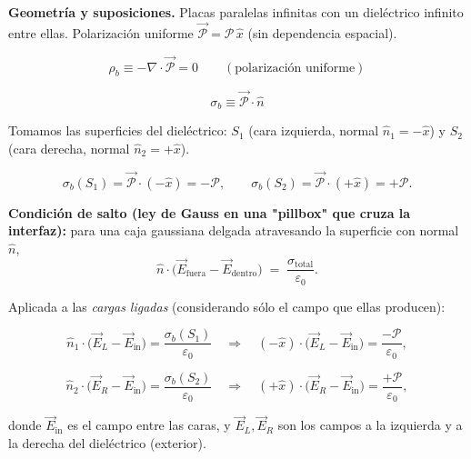 \documentclass{article}
\begin{document}
\textbf{Geometría y suposiciones.} Placas paralelas infinitas con un dieléctrico infinito entre ellas.
Polarización uniforme \(\vec{\mathcal P}= \mathcal P\,\hat{x}\) (sin dependencia espacial).

\begin{equation}
\rho_b \equiv -\nabla\cdot\vec{\mathcal P}=0 \qquad (\text{polarización uniforme})
\end{equation}

\begin{equation}
\sigma_b \equiv \vec{\mathcal P}\cdot\hat{n}
\end{equation}

Tomamos las superficies del dieléctrico:
\(S_1\) (cara izquierda, normal \(\hat{n}_1=-\hat{x}\)) y
\(S_2\) (cara derecha, normal \(\hat{n}_2=+\hat{x}\)).

\begin{equation}
\sigma_b(S_1)=\vec{\mathcal P}\cdot(-\hat{x})=-\mathcal P,
\qquad
\sigma_b(S_2)=\vec{\mathcal P}\cdot(+\hat{x})=+\mathcal P.
\end{equation}

\textbf{Condición de salto (ley de Gauss en una "pillbox" que cruza la interfaz):}
para una caja gaussiana delgada atravesando la superficie con normal \(\hat{n}\),
\begin{equation}
\hat{n}\cdot\big(\vec{E}_{\text{fuera}}-\vec{E}_{\text{dentro}}\big) \;=\; \frac{\sigma_{\text{total}}}{\varepsilon_0}.
\end{equation}

Aplicada a las \emph{cargas ligadas} (considerando sólo el campo que ellas producen):

\begin{equation}
\hat{n}_1\cdot\big(\vec{E}_{L}-\vec{E}_{\text{in}}\big)=\frac{\sigma_b(S_1)}{\varepsilon_0}
\quad\Rightarrow\quad
(-\hat{x})\cdot\big(\vec{E}_{L}-\vec{E}_{\text{in}}\big)=\frac{-\mathcal P}{\varepsilon_0},
\end{equation}

\begin{equation}
\hat{n}_2\cdot\big(\vec{E}_{R}-\vec{E}_{\text{in}}\big)=\frac{\sigma_b(S_2)}{\varepsilon_0}
\quad\Rightarrow\quad
(+\hat{x})\cdot\big(\vec{E}_{R}-\vec{E}_{\text{in}}\big)=\frac{+\mathcal P}{\varepsilon_0},
\end{equation}

donde \(\vec{E}_{\text{in}}\) es el campo entre las caras, y \(\vec{E}_{L},\vec{E}_{R}\) son los campos
a la izquierda y a la derecha del dieléctrico (exterior).
\end{document}
